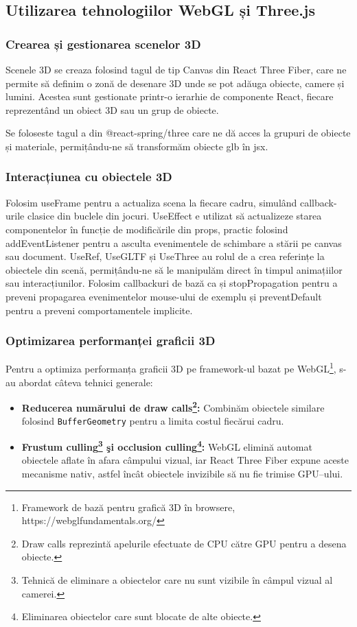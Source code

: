 \subsection{Utilizarea tehnologiilor WebGL și Three.js}
\subsubsection{Crearea și gestionarea scenelor 3D}

Scenele 3D se creaza folosind tagul de tip Canvas din React Three Fiber, care
ne permite să definim o zonă de desenare 3D unde se pot adăuga obiecte, camere și lumini.
Acestea sunt gestionate printr-o ierarhie de componente React, fiecare reprezentând un obiect 3D
sau un grup de obiecte.

Se foloseste tagul a din @react-spring/three care ne dă acces la grupuri de obiecte și
materiale, permițându-ne să transformăm obiecte glb în jsx.

\subsubsection{Interacțiunea cu obiectele 3D}

Folosim useFrame pentru a actualiza scena la fiecare cadru, simulând callback-urile clasice
din buclele din jocuri. UseEffect e utilizat să actualizeze starea componentelor în funcție de modificările 
din props, practic folosind addEventListener pentru a asculta evenimentele de schimbare a stării pe canvas
sau document. UseRef, UseGLTF și UseThree au rolul de a crea referințe la obiectele din scenă,
permițându-ne să le manipulăm direct în timpul animațiilor sau interacțiunilor. Folosim callbackuri
de bază ca și stopPropagation pentru a preveni propagarea evenimentelor mouse-ului de exemplu și 
preventDefault pentru a preveni comportamentele implicite.

\subsubsection{Optimizarea performanței graficii 3D}

Pentru a optimiza performanța graficii 3D pe framework-ul bazat pe WebGL\footnote{Framework de bază pentru grafică 3D în browsere, https://webglfundamentals.org/}, s-au abordat câteva tehnici generale:
\begin{itemize}
  \item \textbf{Reducerea numărului de draw calls\footnote{Draw calls reprezintă apelurile efectuate de CPU către GPU pentru a desena obiecte.}:}
    Combinăm obiectele similare folosind \texttt{BufferGeometry} 
    pentru a limita costul fiecărui cadru.
  \item \textbf{Frustum culling\footnote{Tehnică de eliminare a obiectelor care nu sunt vizibile în câmpul vizual al camerei.} 
  şi occlusion culling\footnote{Eliminarea obiectelor care sunt blocate de alte obiecte.}:} 
    WebGL elimină automat obiectele aflate în afara câmpului vizual, 
    iar React Three Fiber expune aceste mecanisme nativ, astfel încât
    obiectele invizibile să nu fie trimise GPU–ului.
\end{itemize}

